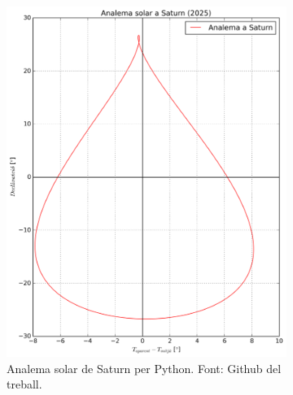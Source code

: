 \documentclass[a4paper, 11pt]{article}
\begin{document}
\begin{figure}[h!]
    \centering
    \begin{subfigure}{0.52\textwidth}
        \centering
        \includegraphics[width=\textwidth]{images/analema_Saturn.png}
        \caption{Analema solar de Saturn per Python. Font: Github del treball.}
    \end{subfigure}
    \hspace{0.05\textwidth}
    \begin{subfigure}{0.38\textwidth}
        \centering

\end{subfigure}
\end{figure}
\end{document}
